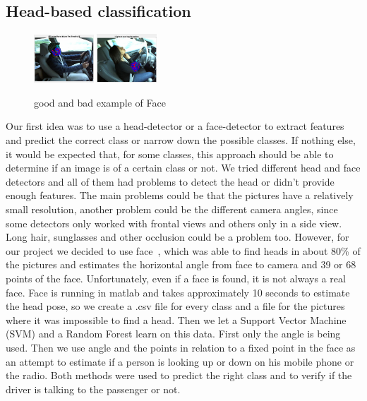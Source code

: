 \documentclass[10pt,twocolumn,letterpaper]{article}
\begin{document}
\subsection{Head-based classification}
\begin{figure}[h]
	\centering
	\includegraphics[width=0.2\textwidth]{face1}\hspace{0.01\textwidth}
	\includegraphics[width=0.2\textwidth]{faces/face7}\\ \vspace{0.01\textwidth}
	\caption{good and bad example of Face}
	\label{face_estimation_example}
\end{figure}
Our first idea was to use a head-detector or a face-detector to extract features and predict the correct class or narrow down the possible classes. If nothing else, it would be expected that, for some classes, this approach should be able to determine if an image is of a certain class or not. We tried different head and face detectors and all of them had problems to detect the head or didn't provide enough features. The main problems could be that the pictures have a relatively small resolution, another problem could be the different camera angles, since some detectors only worked with frontal views and others only in a side view. Long hair, sunglasses and other occlusion could be a problem too. However, for our project we decided to use face~\cite{Ramanan:2012:FDP:2354409.2355119}, which was able to find heads in about 80\% of the pictures and estimates the horizontal angle from face to camera and 39 or 68 points of the face. Unfortunately, even if a face is found, it is not always a real face. Face is running in matlab and takes approximately 10 seconds to estimate the head pose, so we create a .csv file for every class and a file for the pictures where it was impossible to find a head. Then we let a Support Vector Machine (SVM) and a Random Forest learn on this data. First only the angle is being used. Then we use angle and the points in relation to a fixed point in the face as an attempt to estimate if a person is looking up or down on his mobile phone or the radio. Both methods were used to predict the right class and to verify if the driver is talking to the passenger or not.
\end{document}
